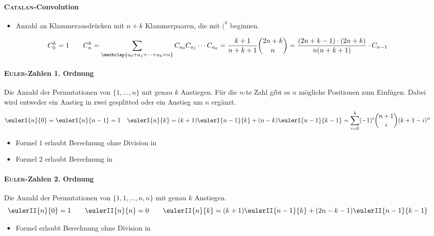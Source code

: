 \paragraph{\textsc{Catalan}-Convolution}
\begin{itemize}
	\item Anzahl an Klammerausdrücken mit $n+k$ Klammerpaaren, die mit $(^k$ beginnen.
\end{itemize}
\[C^k_0 = 1\qquad C^k_n = \sum\limits_{\mathclap{a_0+a_1+\dots+a_k=n}} C_{a_0}C_{a_1}\cdots C_{a_k} =
\frac{k+1}{n+k+1}\binom{2n+k}{n} = \frac{(2n+k-1)\cdot(2n+k)}{n(n+k+1)} \cdot C_{n-1}\]

\paragraph{\textsc{Euler}-Zahlen 1. Ordnung}
Die Anzahl der Permutationen von $\{1, \ldots, n\}$ mit genau $k$ Anstiegen.
Für die $n$-te Zahl gibt es $n$ mögliche Positionen zum Einfügen.
Dabei wird entweder ein Anstieg in zwei gesplitted oder ein Anstieg um $n$ ergänzt.
\[\eulerI{n}{0} = \eulerI{n}{n-1} = 1 \quad
\eulerI{n}{k} = (k+1) \eulerI{n-1}{k} + (n-k) \eulerI{n-1}{k-1}=
\sum_{i=0}^{k} (-1)^i\binom{n+1}{i}(k+1-i)^n\]
\begin{itemize}
	\item Formel $1$ erlaubt Berechnung ohne Division in 
	\item Formel $2$ erlaubt Berechnung in 
\end{itemize}

\paragraph{\textsc{Euler}-Zahlen 2. Ordnung}
Die Anzahl der Permutationen von $\{1,1, \ldots, n,n\}$ mit genau $k$ Anstiegen.
\[\eulerII{n}{0} = 1 \qquad\eulerII{n}{n} = 0 \qquad\eulerII{n}{k} = (k+1) \eulerII{n-1}{k} + (2n-k-1) \eulerII{n-1}{k-1}\]
\begin{itemize}
	\item Formel erlaubt Berechnung ohne Division in 
\end{itemize}


